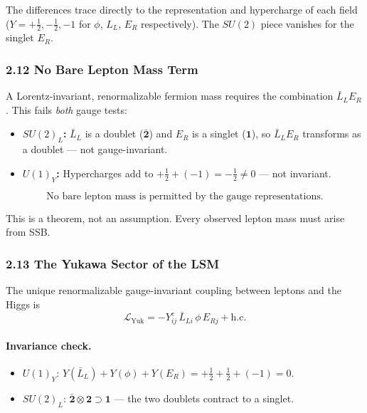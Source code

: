 \documentclass[12pt,a4paper]{article}
\newcommand{\Lag}{\mathcal{L}}
\begin{document}
The differences trace directly to the representation and hypercharge of each field ($Y = +\tfrac{1}{2}, -\tfrac{1}{2}, -1$ for $\phi$, $L_L$, $E_R$ respectively). The $SU(2)$ piece vanishes for the singlet $E_R$.

\subsubsection*{2.12 \quad No Bare Lepton Mass Term}

A Lorentz-invariant, renormalizable fermion mass requires the combination $\bar L_L E_R$. This fails \emph{both} gauge tests:

\begin{itemize}
  \item \textbf{$SU(2)_L$:} $\bar L_L$ is a doublet ($\bar{\mathbf{2}}$) and $E_R$ is a singlet ($\mathbf{1}$), so $\bar L_L E_R$ transforms as a doublet — not gauge-invariant.
  \item \textbf{$U(1)_Y$:} Hypercharges add to $+\tfrac{1}{2} + (-1) = -\tfrac{1}{2} \neq 0$ — not invariant.
\end{itemize}

\begin{equation}
  \boxed{\;\text{No bare lepton mass is permitted by the gauge representations.}\;}
\end{equation}

This is a theorem, not an assumption. Every observed lepton mass must arise from SSB.

\subsubsection*{2.13 \quad The Yukawa Sector of the LSM}

The unique renormalizable gauge-invariant coupling between leptons and the Higgs is
\begin{equation}
  \boxed{\;
  \Lag_{\mathrm{Yuk}} = -Y^e_{ij}\,\bar L_{Li}\,\phi\,E_{Rj} + \text{h.c.}
  \;}
  \label{eq:sg:lsm_yukawa}
\end{equation}

\paragraph{Invariance check.}
\begin{itemize}
  \item $U(1)_Y$: $Y(\bar L_L) + Y(\phi) + Y(E_R) = +\tfrac{1}{2} + \tfrac{1}{2} + (-1) = 0$. \checkmark
  \item $SU(2)_L$: $\bar{\mathbf{2}} \otimes \mathbf{2} \supset \mathbf{1}$ — the two doublets contract to a singlet. \checkmark
\end{itemize}
\end{document}
